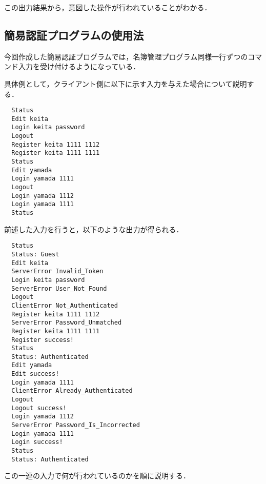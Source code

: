 \documentclass[11pt]{jsarticle}
\begin{document}
この出力結果から，意図した操作が行われていることがわかる．

\subsection{簡易認証プログラムの使用法}

今回作成した簡易認証プログラムでは，名簿管理プログラム同様一行ずつのコマンド入力を受け付けるようになっている．

具体例として，クライアント側に以下に示す入力を与えた場合について説明する．

\begin{verbatim}
  Status
  Edit keita
  Login keita password
  Logout
  Register keita 1111 1112
  Register keita 1111 1111
  Status
  Edit yamada
  Login yamada 1111
  Logout
  Login yamada 1112
  Login yamada 1111
  Status
\end{verbatim}

前述した入力を行うと，以下のような出力が得られる．

\begin{verbatim}
  Status
  Status: Guest
  Edit keita
  ServerError Invalid_Token
  Login keita password
  ServerError User_Not_Found
  Logout
  ClientError Not_Authenticated
  Register keita 1111 1112
  ServerError Password_Unmatched
  Register keita 1111 1111
  Register success!
  Status
  Status: Authenticated
  Edit yamada
  Edit success!
  Login yamada 1111
  ClientError Already_Authenticated
  Logout
  Logout success!
  Login yamada 1112
  ServerError Password_Is_Incorrected
  Login yamada 1111
  Login success!
  Status
  Status: Authenticated
\end{verbatim}

この一連の入力で何が行われているのかを順に説明する．
\end{document}
